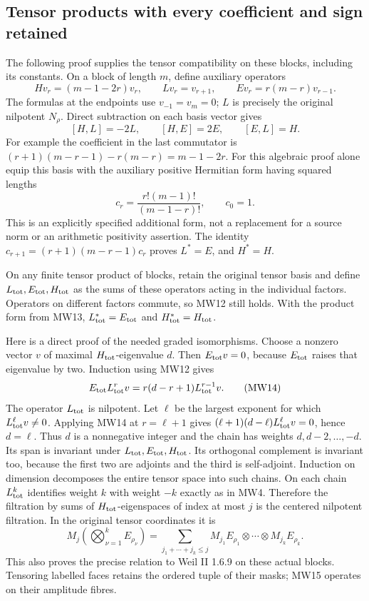 \documentclass[11pt,a4paper]{article}
\begin{document}
\subsection{Tensor products with every coefficient and sign retained}

The following proof supplies the tensor compatibility on these blocks,
including its constants. On a block of length \(m\), define auxiliary
operators
\[
 H v_r=(m-1-2r)v_r,\qquad
 L v_r=v_{r+1},\qquad
 E v_r=r(m-r)v_{r-1}.
 \tag{MW11}
\]
The formulas at the endpoints use \(v_{-1}=v_m=0\); \(L\) is precisely
the original nilpotent \(N_\rho\). Direct subtraction on each basis
vector gives
\[
 [H,L]=-2L,\qquad [H,E]=2E,\qquad [E,L]=H .
 \tag{MW12}
\]
For example the coefficient in the last commutator is
\((r+1)(m-r-1)-r(m-r)=m-1-2r\).
For this algebraic proof alone equip this basis with the auxiliary
positive Hermitian form having squared lengths
\[
 c_r=\frac{r!(m-1)!}{(m-1-r)!},\qquad c_0=1 .
 \tag{MW13}
\]
This is an explicitly specified additional form, not a replacement
for a source norm or an arithmetic positivity assertion.
The identity
\(c_{r+1}=(r+1)(m-r-1)c_r\) proves \(L^*=E\), and \(H^*=H\).

On any finite tensor product of blocks, retain the original tensor
basis and define \(L_{\rm tot},E_{\rm tot},H_{\rm tot}\) as the sums
of these operators acting in the individual factors. Operators on
different factors commute, so MW12 still holds. With the product
form from MW13, \(L_{\rm tot}^*=E_{\rm tot}\) and
\(H_{\rm tot}^*=H_{\rm tot}\).

Here is a direct proof of the needed graded isomorphisms.
Choose a nonzero vector \(v\) of maximal \(H_{\rm tot}\)-eigenvalue
\(d\). Then \(E_{\rm tot}v=0\), because \(E_{\rm tot}\) raises that
eigenvalue by two. Induction using MW12 gives
\[
 E_{\rm tot}L_{\rm tot}^r v
       =r(d-r+1)L_{\rm tot}^{r-1}v .
 \tag{MW14}
\]
The operator \(L_{\rm tot}\) is nilpotent. Let \(\ell\) be the
largest exponent for which \(L_{\rm tot}^\ell v\ne0\).
Applying MW14 at \(r=\ell+1\) gives
\((\ell+1)(d-\ell)L_{\rm tot}^\ell v=0\), hence \(d=\ell\).
Thus \(d\) is a nonnegative integer and the chain has weights
\(d,d-2,\ldots,-d\).
Its span is invariant under \(L_{\rm tot},E_{\rm tot},H_{\rm tot}\).
Its orthogonal complement is invariant too, because the first two
are adjoints and the third is self-adjoint. Induction on dimension
decomposes the entire tensor space into such chains.
On each chain \(L_{\rm tot}^k\) identifies weight \(k\) with weight
\(-k\) exactly as in MW4. Therefore the filtration by sums of
\(H_{\rm tot}\)-eigenspaces of index at most \(j\) is the centered
nilpotent filtration. In the original tensor coordinates it is
\[
 M_j\left(\bigotimes_{\nu=1}^k E_{\rho_\nu}\right)
   =\sum_{j_1+\cdots+j_k\leq j}
        M_{j_1}E_{\rho_1}\otimes\cdots\otimes M_{j_k}E_{\rho_k}.
 \tag{MW15}
\]
This also proves the precise relation to Weil II 1.6.9 on these
actual blocks. Tensoring labelled faces retains the ordered tuple
of their masks; MW15 operates on their amplitude fibres.
\end{document}
